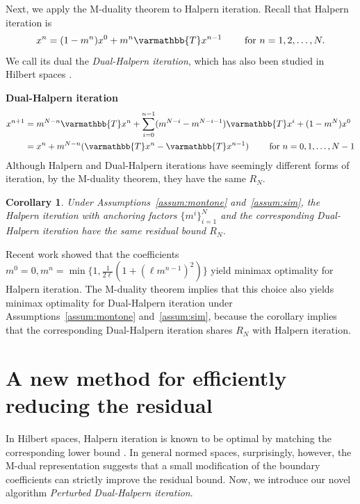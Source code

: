 \documentclass[pdflatex,sn-mathphys-num]{sn-jnl}%
\newcommand{\opT}{{\varmathbb{T}}}
\theoremstyle{thmstyleone}%
\theoremstyle{thmstyletwo}%
\theoremstyle{thmstylethree}%
\newtheorem{corollary}{Corollary}
\begin{document}
Next, we apply the M-duality theorem to Halpern iteration. Recall that Halpern iteration is
\[ x^{n}= (1-m^{n})x^{0}+ m^n \opT x^{n-1}
\qquad\text{ for } n=1,2,\dots,N.\]
We call its dual the \emph{Dual-Halpern iteration}, which has also been studied in Hilbert spaces \cite{yoon2024optimal, yoon2026toward}.

\vspace{0.3in}

\textbf{Dual-Halpern iteration}
\begin{align*}
    x^{n+1} &= m^{N-n} \opT x^{n} +\sum^{n-1}_{i=0} (m^{N-i}-m^{N-i-1})  \opT x^{i}+(1-m^N)x^0
    \\&= x^{n} + m^{N-n}( \opT x^{n}- \opT x^{n-1}) \qquad\text{ for } n=0,1,\dots,N-1
\end{align*}
Although Halpern and Dual-Halpern iterations have seemingly different forms of iteration,  by the M-duality theorem, they have the same $R_N$.
\begin{corollary}
   Under Assumptions~\ref{assum:montone} and~\ref{assum:sim}, the Halpern iteration with anchoring factors $\{m^i\}^N_{i=1}$ and the corresponding Dual-Halpern iteration have the same  residual bound $R_N$.
\end{corollary}
Recent work \cite{bravo2026minimax} showed that the coefficients $m^0=0, m^n= \min \{1, \frac{1}{2\ell} (1+(\ell m^{n-1})^2)\}$ yield minimax optimality for Halpern iteration. 
The M-duality theorem implies that this choice also yields minimax optimality for Dual-Halpern iteration under Assumptions~\ref{assum:montone} and~\ref{assum:sim}, because the corollary implies that the corresponding Dual-Halpern iteration shares $R_N$ with Halpern iteration.

\section{A new method for efficiently reducing the residual}\label{sec4}

In Hilbert spaces, Halpern iteration is known to be optimal by matching the
corresponding lower bound \cite{pr2022}. In general normed spaces, surprisingly, however,
the M-dual representation suggests that a small modification of the boundary
coefficients can strictly improve the residual bound. Now, we introduce our novel algorithm \emph{Perturbed Dual-Halpern iteration}.
\end{document}
